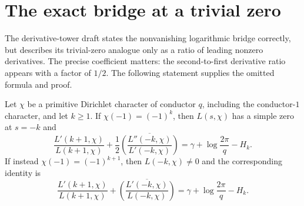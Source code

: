 \section{The exact bridge at a trivial zero}
\label{bridge:section}

The derivative-tower draft states the nonvanishing logarithmic bridge
correctly, but describes its trivial-zero analogue only as a ratio of
leading nonzero derivatives.  The precise coefficient matters: the
second-to-first derivative ratio appears with a factor of $1/2$.
The following statement supplies the omitted formula and proof.

\begin{theorem}\label{bridge:trivial}
Let $\chi$ be a primitive Dirichlet character of conductor $q$, including
the conductor-$1$ character, and let $k\geq1$.  If
$\chi(-1)=(-1)^k$, then $L(s,\chi)$ has a simple zero at $s=-k$ and
\begin{equation}\label{bridge:formula}
 \frac{L'(k+1,\chi)}{L(k+1,\chi)}
 +\frac12\overline{\left(
       \frac{L''(-k,\chi)}{L'(-k,\chi)}\right)}
 =\gamma+\log\frac{2\pi}{q}-H_k.
\end{equation}
If instead $\chi(-1)=(-1)^{k+1}$, then $L(-k,\chi)\ne0$ and the
corresponding identity is
\begin{equation}\label{bridge:nontrivial}
 \frac{L'(k+1,\chi)}{L(k+1,\chi)}
 +\overline{\left(
       \frac{L'(-k,\chi)}{L(-k,\chi)}\right)}
 =\gamma+\log\frac{2\pi}{q}-H_k.
\end{equation}
\end{theorem}

